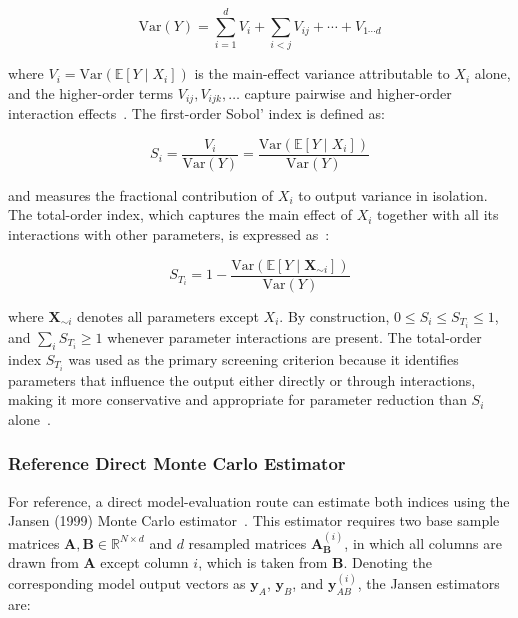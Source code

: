 \documentclass{article}
\begin{document}
\begin{equation}
    \mathrm{Var}(Y)
    = \sum_{i=1}^{d} V_i
    + \sum_{i < j} V_{ij}
    + \cdots
    + V_{1 \cdots d}
    \label{eq:anova_decomp}
\end{equation}

\noindent where $V_i = \mathrm{Var}\!\left(\mathbb{E}[Y \mid X_i]\right)$
is the main-effect variance attributable to $X_i$ alone, and the
higher-order terms $V_{ij}, V_{ijk}, \ldots$ capture pairwise and
higher-order interaction effects~\cite{Saltelli2010}. The
first-order Sobol' index is defined as:

\begin{equation}
    S_i = \frac{V_i}{\mathrm{Var}(Y)}
        = \frac{\mathrm{Var}\!\left(\mathbb{E}[Y \mid X_i]\right)}
               {\mathrm{Var}(Y)}
    \label{eq:s1}
\end{equation}

\noindent and measures the fractional contribution of $X_i$ to
output variance in isolation. The total-order index, which captures
the main effect of $X_i$ together with all its interactions with
other parameters, is expressed as~\cite{Saltelli2010}:

\begin{equation}
    S_{T_i}
    = 1 - \frac{\mathrm{Var}\!\left(
                \mathbb{E}[Y \mid \mathbf{X}_{\sim i}]\right)}
               {\mathrm{Var}(Y)}
    \label{eq:st}
\end{equation}

\noindent where $\mathbf{X}_{\sim i}$ denotes all parameters
except $X_i$. By construction, $0 \leq S_i \leq S_{T_i} \leq 1$,
and $\sum_i S_{T_i} \geq 1$ whenever parameter interactions are
present. The total-order index $S_{T_i}$ was used as the primary
screening criterion because it identifies parameters that influence
the output either directly or through interactions, making it more
conservative and appropriate for parameter reduction than $S_i$
alone~\cite{Saltelli2010}.

\subsubsection{Reference Direct Monte Carlo Estimator}
\label{sec:jansen}

For reference, a direct model-evaluation route can estimate both indices using the
Jansen (1999) Monte Carlo estimator~\cite{Jansen1999,
Saltelli2010}. This estimator requires two base sample matrices
$\mathbf{A}, \mathbf{B} \in \mathbb{R}^{N \times d}$ and $d$
resampled matrices $\mathbf{A}_{\mathbf{B}}^{(i)}$, in which
all columns are drawn from $\mathbf{A}$ except column $i$, which
is taken from $\mathbf{B}$. Denoting the corresponding model
output vectors as $\mathbf{y}_A$, $\mathbf{y}_B$, and
$\mathbf{y}_{AB}^{(i)}$, the Jansen estimators are:
\end{document}
